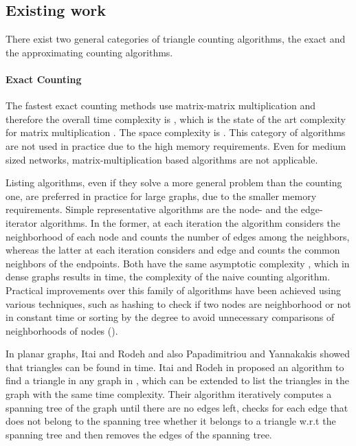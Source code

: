 \documentclass{llncs}
\begin{document}
\subsection{Existing work}
There exist two general categories of triangle counting algorithms, the exact
and the approximating counting algorithms. 

\paragraph{Exact Counting}
The fastest exact counting methods use matrix-matrix multiplication and therefore
the overall time complexity is ,  which is the state of the art complexity
for matrix multiplication \cite{CopperWino:CopperWino}. The space complexity is . 
This category of algorithms are not used in practice due to the high memory requirements.
Even for medium sized networks, matrix-multiplication based algorithms are not applicable. 

Listing algorithms, even if they solve a more general problem than the counting one,
are preferred in practice for large graphs, due to the smaller memory requirements.
Simple representative algorithms are the node- and the edge-iterator algorithms.
In the former, at each iteration the algorithm considers the neighborhood of each node and counts
the number of edges among the neighbors, whereas the latter at each iteration considers and edge
and counts the common neighbors of the endpoints. Both have the same asymptotic complexity , 
which in dense graphs results in  time, the complexity of the naive counting algorithm. 
Practical improvements over this family of algorithms have been achieved using various techniques, such as 
hashing to check if two nodes are neighborhood or not in constant time or sorting by the degree
to avoid unnecessary comparisons of neighborhoods of nodes (\cite{latapy,wagner:wagner}).

In planar graphs, Itai and Rodeh \cite{itai:rodeh} and also Papadimitriou and Yannakakis \cite{pap:yan} showed that triangles can be found in  time.
Itai and Rodeh in \cite{itai:rodeh} proposed an algorithm to find a triangle in any graph in ,
which can be extended to list the triangles in the graph with the same time complexity.
Their algorithm iteratively computes a spanning tree of the graph until there are no edges left, 
checks for each edge  that does not belong to the spanning tree whether it belongs to
a triangle w.r.t the spanning tree and then removes the edges of the spanning tree.
\end{document}
